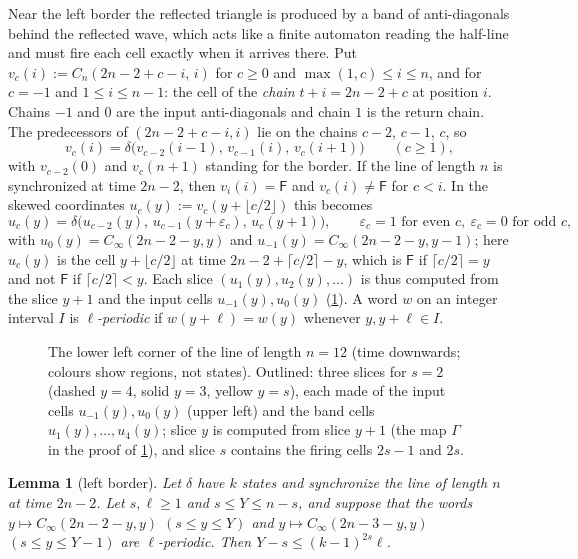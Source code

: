\documentclass[3p]{elsarticle}
\newtheorem{lemma}[theorem]{Lemma}
\theoremstyle{remark}
\begin{document}
Near the left border the reflected triangle is produced by a band of
anti-diagonals behind the reflected wave, which acts like a finite automaton
reading the half-line and must fire each cell exactly when it arrives there.
Put $v_c(i):=C_n(2n-2+c-i,\,i)$ for $c\ge0$ and $\max(1,c)\le i\le n$, and for
$c=-1$ and $1\le i\le n-1$: the cell of the \emph{chain} $t+i=2n-2+c$ at
position $i$. Chains $-1$ and $0$ are the input anti-diagonals and chain $1$ is
the return chain. The predecessors of $(2n-2+c-i,i)$ lie on the chains $c-2$,
$c-1$, $c$, so
\begin{equation}\label{eq:chains}
v_c(i)=\delta\bigl(v_{c-2}(i-1),\,v_{c-1}(i),\,v_c(i+1)\bigr)\qquad(c\ge1),
\end{equation}
with $v_{c-2}(0)$ and $v_c(n+1)$ standing for the border. If the line of length
$n$ is synchronized at time $2n-2$, then $v_i(i)=\mathsf F$ and
$v_c(i)\ne\mathsf F$ for $c<i$. In the skewed coordinates
$u_c(y):=v_c(y+\lfloor c/2\rfloor)$ this becomes
\begin{equation}\label{eq:slices}
u_c(y)=\delta\bigl(u_{c-2}(y),\,u_{c-1}(y+\varepsilon_c),\,u_c(y+1)\bigr),
\qquad \varepsilon_c=1\text{ for even }c,\ \varepsilon_c=0\text{ for odd }c,
\end{equation}
with $u_0(y)=C_\infty(2n-2-y,y)$ and $u_{-1}(y)=C_\infty(2n-2-y,y-1)$; here
$u_c(y)$ is the cell $y+\lfloor c/2\rfloor$ at time
$2n-2+\lceil c/2\rceil-y$, which is $\mathsf F$ if $\lceil c/2\rceil=y$ and not
$\mathsf F$ if $\lceil c/2\rceil<y$. Each slice $(u_1(y),u_2(y),\dots)$ is thus
computed from the slice $y+1$ and the input cells $u_{-1}(y),u_0(y)$
(\cref{fig:chains}). A word $w$ on an integer interval $I$ is
\emph{$\ell$-periodic} if $w(y+\ell)=w(y)$ whenever $y,y+\ell\in I$.

\begin{figure}[t]
\centering
\scalebox{0.92}{}
\caption{The lower left corner of the line of length $n=12$ (time downwards;
colours show regions, not states). Outlined: three slices for $s=2$ (dashed
$y=4$, solid $y=3$, yellow $y=s$), each made of the input cells
$u_{-1}(y),u_0(y)$ (upper left) and the band cells $u_1(y),\dots,u_4(y)$; slice
$y$ is computed from slice $y+1$ (the map $\Gamma$ in the proof of
\cref{lem:left}), and slice $s$ contains the firing cells $2s-1$ and $2s$.}
\label{fig:chains}
\end{figure}

\begin{lemma}[left border]\label{lem:left}
Let $\delta$ have $k$ states and synchronize the line of length $n$ at time
$2n-2$. Let $s,\ell\ge1$ and $s\le Y\le n-s$, and suppose that the words
$y\mapsto C_\infty(2n-2-y,y)$ $(s\le y\le Y)$ and $y\mapsto C_\infty(2n-3-y,y)$
$(s\le y\le Y-1)$ are $\ell$-periodic. Then $Y-s\le(k-1)^{2s}\ell$.
\end{lemma}
\end{document}
